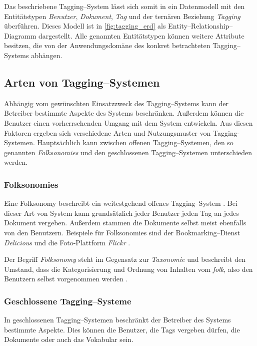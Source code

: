Das beschriebene Tagging--System lässt sich somit in ein Datenmodell mit den Entitätstypen \emph{Benutzer}, \emph{Dokument}, \emph{Tag} und  der ternären Beziehung \emph{Tagging} überführen. Dieses Modell ist in \cref{fig:tagging_erd} als Entity--Relationship--Diagramm dargestellt. Alle genannten Entitätstypen können weitere Attribute besitzen, die von der Anwendungsdomäne des konkret betrachteten Tagging--Systems abhängen.

\subsection{Arten von Tagging--Systemen}
\label{tagging_types}

Abhängig vom gewünschten Einsatzzweck des Tagging--Systems kann der Betreiber bestimmte Aspekte des Systems beschränken. Außerdem können die Benutzer einen vorherrschenden Umgang mit dem System entwickeln. Aus diesen Faktoren ergeben sich verschiedene Arten und Nutzungsmuster von Tagging-Systemen. Hauptsächlich kann zwischen offenen Tagging--Systemen, den so genannten \emph{Folksonomies} und den geschlossenen Tagging--Systemen unterschieden werden.

\subsubsection{Folksonomies}

Eine Folksonomy beschreibt ein weitestgehend offenes Tagging--System \cite{ma2004}. Bei dieser Art von System kann grundsätzlich jeder Benutzer jeden Tag an jedes Dokument vergeben. Außerdem stammen die Dokumente selbst meist ebenfalls von den Benutzern. Beispiele für Folksonomies sind der Bookmarking--Dienst \emph{Delicious} \cite{deli} und die Foto-Plattform \emph{Flickr} \cite{flickr}.

Der Begriff \emph{Folksonomy} steht im Gegensatz zur \emph{Taxonomie} und beschreibt den Umstand, dass die Kategorisierung und Ordnung von Inhalten vom \emph{folk}, also den Benutzern selbst vorgenommen werden \cite{vt2007}.

\subsubsection{Geschlossene Tagging--Systeme}

In geschlossenen Tagging--Systemen beschränkt der Betreiber des Systems bestimmte Aspekte. Dies können die Benutzer, die Tags vergeben dürfen, die Dokumente oder auch das Vokabular sein.

